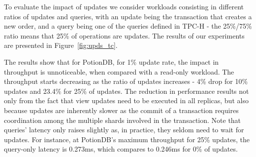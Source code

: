 \documentclass[sigplan,twocolumn,review,anonymous]{acmart}
\begin{document}
To evaluate the impact of updates we consider workloads consisting in different ratios of updates and queries, with
an update being the transaction that creates a new order, and a query being one of the queries defined in
TPC-H - the 25\%/75\% ratio means that 25\% of operations are updates. The results of our experiments
are presented in Figure~\ref{fig:upds_tc}.

The results show that for PotionDB, for 1\% update rate, the impact in throughput is unnoticeable, when compared with a read-only workload.
The throughput starts decreasing as the ratio of updates increases - 4\% drop for 10\% updates and 23.4\% for 25\% of updates.
The reduction in performance results not only from the fact that view updates need to be executed in all replicas, but also because 
updates are inherently slower as the commit of a transaction requires coordination among the multiple shards involved in the transaction. 
Note that queries' latency only raises slightly as, in practice, they seldom need to wait for updates.
For instance, at PotionDB's maximum throughput for 25\% updates, the query-only latency is 0.273ms, which compares to 0.246ms for 0\% of updates.

\end{document}
